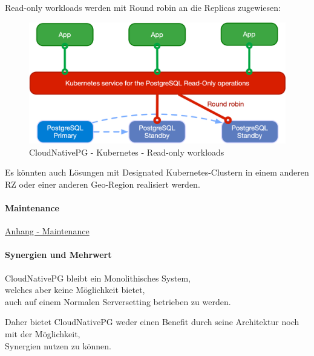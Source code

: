 \begin{flushleft}
    Read-only workloads werden mit Round robin an die Replicas zugewiesen:
    \begin{figure}[H]
        \centering
        \includegraphics[width=0.75\linewidth]{source/implementation/evaluation/postgresql_ha_solutions/cloudnativepg/cloudnativepg-architecture-read-only}
        \caption{CloudNativePG - Kubernetes - Read-only workloads}
        \label{fig:cloudnativepg-architecture-read-only}
    \end{figure}
\end{flushleft}
\begin{flushleft}
    Es könnten auch Lösungen mit Designated Kubernetes-Clustern in einem anderen RZ oder einer anderen Geo-Region realisiert werden.
\end{flushleft}
\begin{flushleft}
    \paragraph{Maintenance}
    \hyperref[subsec:maintenance_cloudnativepg]{Anhang - Maintenance}

\end{flushleft}
\begin{flushleft}
    \paragraph{Synergien und Mehrwert}
    CloudNativePG bleibt ein Monolithisches System,\\welches aber keine Möglichkeit bietet,\\auch auf einem Normalen Serversetting betrieben zu werden.
\end{flushleft}
\begin{flushleft}
    Daher bietet CloudNativePG weder einen Benefit durch seine Architektur noch mit der Möglichkeit,\\Synergien nutzen zu können.
\end{flushleft}